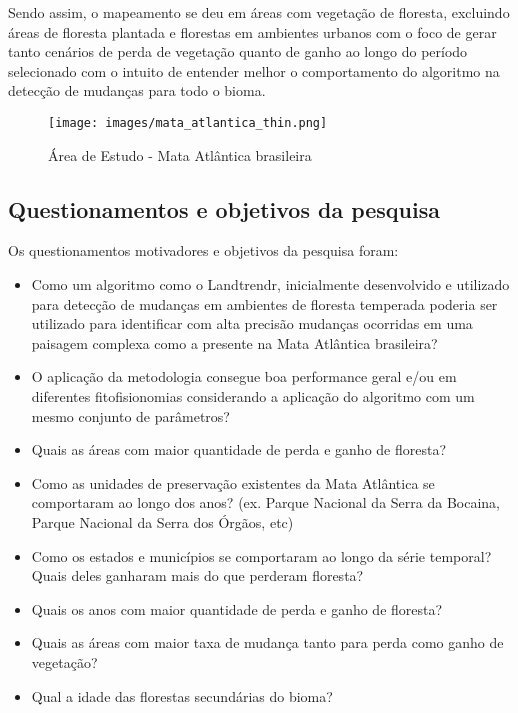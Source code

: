 Sendo assim, o mapeamento se deu em áreas com vegetação de floresta, excluindo áreas de floresta plantada e florestas em ambientes urbanos com o foco de gerar tanto cenários de perda de vegetação quanto de ganho ao longo do período selecionado com o intuito de entender melhor o comportamento do algoritmo na detecção de mudanças para todo o bioma. 

\begin{figure}[h!]
    \centering
    \texttt{[image: images/mata\_atlantica\_thin.png]}
    \caption{Área de Estudo - Mata Atlântica brasileira}
    \label{fig:mata_atlantica}
\end{figure}

\newpage

\subsection{Questionamentos e objetivos da pesquisa}
Os questionamentos motivadores e objetivos da pesquisa foram:
\begin{itemize}
    \item Como um algoritmo como o Landtrendr, inicialmente desenvolvido e utilizado para detecção de mudanças em ambientes de floresta temperada poderia ser utilizado para identificar com alta precisão mudanças ocorridas em uma paisagem complexa como a presente na Mata Atlântica brasileira?
    
    \item O aplicação da metodologia consegue boa performance geral e/ou em diferentes fitofisionomias considerando a aplicação do algoritmo com um mesmo conjunto de parâmetros?
    
    \item Quais as áreas com maior quantidade de perda e ganho de floresta?
    
    \item Como as unidades de preservação existentes da Mata Atlântica se comportaram ao longo dos anos? (ex. Parque Nacional da Serra da Bocaina, Parque Nacional da Serra dos Órgãos, etc)
    
    \item Como os estados e municípios se comportaram ao longo da série temporal? Quais deles ganharam mais do que perderam floresta?
    
    \item Quais os anos com maior quantidade de perda e ganho de floresta?
    
    \item Quais as áreas com maior taxa de mudança tanto para perda como ganho de vegetação? 
    
    \item Qual a idade das florestas secundárias do bioma? 
\end{itemize}

